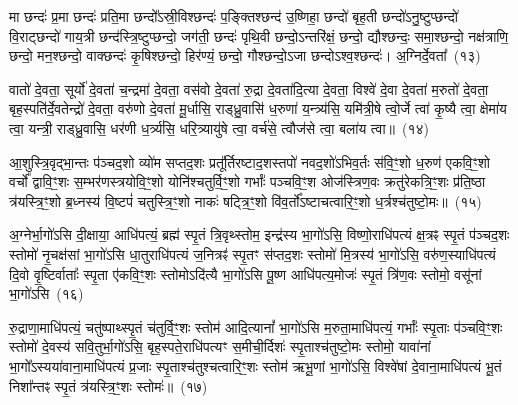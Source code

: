 {\anuvakamend[{छ॒र्दिषा॑ पिन्व॒ षट्च॑}]}%

मा छन्दः॑ प्र॒मा छन्दः॑ प्रति॒मा छन्दो᳚\-ऽस्री॒विश्छन्दः॑ प॒ङ्क्तिश्छन्द॑ उ॒ष्णिहा॒ छन्दो॑ बृह॒ती छन्दो॑\-ऽनु॒ष्टुप्छन्दो॑ वि॒राट्छन्दो॑ गाय॒त्री छन्द॑स्त्रि॒ष्टुप्छन्दो॒ जग॑ती॒ छन्दः॑ पृथि॒वी छन्दो॒\-ऽन्तरि॑क्षं॒ छन्दो॒ द्यौश्छन्दः॒ समा॒श्छन्दो॒ नक्ष॑त्राणि॒ छन्दो॒ मन॒श्छन्दो॒ वाक्छन्दः॑ कृ॒षिश्छन्दो॒ हिर॑ण्यं॒ छन्दो॒ गौश्छन्दो॒\-ऽजा छन्दो\-ऽश्व॒श्छन्दः॑। अ॒ग्निर्दे॒वता᳚~(१३)

वातो॑ दे॒वता॒ सूर्यो॑ दे॒वता॑ च॒न्द्रमा॑ दे॒वता॒ वस॑वो दे॒वता॑ रु॒द्रा दे॒वता॑दि॒त्या दे॒वता॒ विश्वे॑ दे॒वा दे॒वता॑ म॒रुतो॑ दे॒वता॒ बृह॒स्पति॑र्दे॒वतेन्द्रो॑ दे॒वता॒ वरु॑णो दे॒वता॑ मू॒र्धासि॒ राड्ध्रु॒वासि॑ ध॒रुणा॑ य॒न्त्र्य॑सि॒ यमि॑त्री॒षे त्वो॒र्जे त्वा॑ कृ॒ष्यै त्वा॒ क्षेमा॑य त्वा॒ यन्त्री॒ राड्ध्रु॒वासि॒ धर॑णी ध॒र्त्र्य॑सि॒ धरि॒त्र्यायु॑षे त्वा॒ वर्च॑से॒ त्वौज॑से त्वा॒ बला॑य त्वा॥~(१४)

{\anuvakamend[{दे॒वता\-ऽ\-ऽयु॑षे त्वा॒ षट्च॑}]}%

आ॒शुस्त्रि॒वृद्भा॒न्तः प॑ञ्चद॒शो व्यो॑म सप्तद॒शः प्रतू᳚र्तिरष्टाद॒शस्तपो॑ नवद॒शो॑\-ऽभिव॒र्तः स॑वि॒ꣳ॒शो ध॒रुण॑ एकवि॒ꣳ॒शो वर्चो᳚ द्वावि॒ꣳ॒शः स॒म्भर॑णस्त्रयोवि॒ꣳ॒शो योनि॑श्चतुर्वि॒ꣳ॒शो गर्भाः᳚ पञ्चवि॒ꣳ॒श ओज॑स्त्रिण॒वः क्रतु॑रेकत्रि॒ꣳ॒शः प्र॑ति॒ष्ठा त्र॑यस्त्रि॒ꣳ॒शो ब्र॒ध्नस्य॑ वि॒ष्टपं॑ चतुस्त्रि॒ꣳ॒शो नाकः॑ षट्त्रि॒ꣳ॒शो वि॑व॒र्तो᳚\-ऽष्टाचत्वारि॒ꣳ॒शो ध॒र्त्रश्च॑तुष्टो॒मः॥~(१५)

{\anuvakamend[{आ॒शुः स॒प्तत्रिꣳ॑शत्}]}%

अ॒ग्नेर्भा॒गो॑\-ऽसि दी॒क्षाया॒ आधि॑पत्यं॒ ब्रह्म॑ स्पृ॒तं त्रि॒वृथ्स्तोम॒ इन्द्र॑स्य भा॒गो॑\-ऽसि॒ विष्णो॒राधि॑पत्यं क्ष॒त्रꣴ स्पृ॒तं प॑ञ्चद॒शः स्तोमो॑ नृ॒चक्ष॑सां भा॒गो॑\-ऽसि धा॒तुराधि॑पत्यं ज॒नित्रꣴ॑ स्पृ॒तꣳ स॑प्तद॒शः स्तोमो॑ मि॒त्रस्य॑ भा॒गो॑\-ऽसि॒ वरु॑ण॒स्याधि॑पत्यं दि॒वो वृ॒ष्टिर्वाताः᳚ स्पृ॒ता ए॑कवि॒ꣳ॒शः स्तोमो\-ऽदि॑त्यै भा॒गो॑\-ऽसि पू॒ष्ण आधि॑पत्य॒मोजः॑ स्पृ॒तं त्रि॑ण॒वः स्तोमो॒ वसू॑नां भा॒गो॑\-ऽसि~(१६)

रु॒द्राणा॒माधि॑पत्यं॒ चतु॑ष्पाथ्स्पृ॒तं च॑तुर्वि॒ꣳ॒शः स्तोम॑ आदि॒त्यानां᳚ भा॒गो॑\-ऽसि म॒रुता॒माधि॑पत्यं॒ गर्भाः᳚ स्पृ॒ताः प॑ञ्चवि॒ꣳ॒शः स्तोमो॑ दे॒वस्य॑ सवि॒तुर्भा॒गो॑\-ऽसि॒ बृह॒स्पते॒राधि॑पत्यꣳ स॒मीची॒र्दिशः॑ स्पृ॒ताश्च॑तुष्टो॒मः स्तोमो॒ यावा॑नां भा॒गो᳚\-ऽस्यया॑वाना॒माधि॑पत्यं प्र॒जाः स्पृ॒ताश्च॑तुश्चत्वारि॒ꣳ॒शः स्तोम॑ ऋभू॒णां भा॒गो॑\-ऽसि॒ विश्वे॑षां दे॒वाना॒माधि॑पत्यं भू॒तं निशा᳚न्तꣴ स्पृ॒तं त्र॑यस्त्रि॒ꣳ॒शः स्तोमः॑॥~(१७)

{\anuvakamend[{वसू॑नां भा॒गो॑\-ऽसि॒ षट्च॑त्वारिꣳशच्च}]}%

